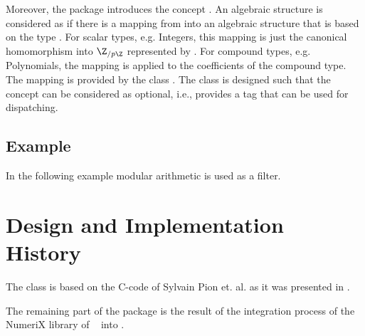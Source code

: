 Moreover, the package introduces the concept . 
An algebraic structure  is considered as  if there 
is a mapping from  into an algebraic structure that is based on 
the type .  
For scalar types, e.g. Integers, this mapping is just the canonical 
homomorphism into $\Z_{/p\Z}$ represented by . 
For compound types, e.g. Polynomials, the mapping is applied to the 
coefficients of the compound type. 
The mapping is provided by the class .
The class  is designed such that the concept 
 can be considered as optional, i.e., 
 provides a tag that can be used for dispatching. 

\subsection{Example}

In the following example modular arithmetic is used as a filter. 

\section{Design and Implementation History}

The class  is based on the C-code of Sylvain Pion et. al. 
as it was presented in \cite{bepp-sdrns-99}. 

The remaining part of the package is the result of the integration process
of the NumeriX library of \exacus\ \cite{beh+-eeeafcs-05} into \cgal.
